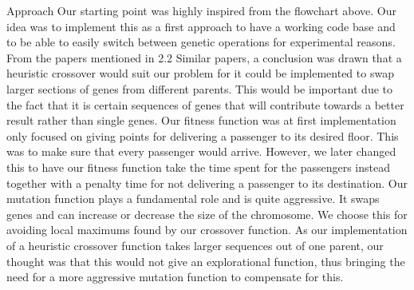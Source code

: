 Approach
Our starting point was highly inspired from the flowchart above\cite{tartan2016genetic}. Our idea was to implement this as a first approach to have a working code base and to be able to easily switch between genetic operations for experimental reasons. From the papers mentioned in 2.2 Similar papers, a conclusion was drawn that a heuristic crossover would suit our problem for it could be implemented to swap larger sections of genes from different parents. This would be important due to the fact that it is certain sequences of genes that will contribute towards a better result rather than single genes. Our fitness function was at first implementation only focused on giving points for delivering a passenger to its desired floor. This was to make sure that every passenger would arrive. However, we later changed this to have our fitness function take the time spent for the passengers instead together with a penalty time for not delivering a passenger to its destination. Our mutation function plays a fundamental role and is quite aggressive. It swaps genes and can increase or decrease the size of the chromosome. We choose this for avoiding local maximums found by our crossover function. As our implementation of a heuristic crossover function takes larger sequences out of one parent, our thought was that this would not give an explorational function, thus bringing the need for a more aggressive mutation function to compensate for this.
